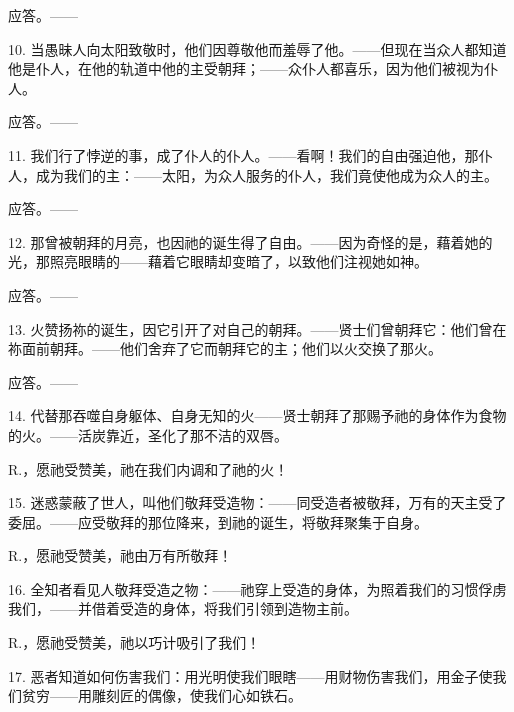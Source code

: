 应答。——\par

10. 当愚昧人向太阳致敬时，他们因尊敬他而羞辱了他。——但现在当众人都知道他是仆人，在他的轨道中他的主受朝拜；——众仆人都喜乐，因为他们被视为仆人。\par

应答。——\par

11. 我们行了悖逆的事，成了仆人的仆人。——看啊！我们的自由强迫他，那仆人，成为我们的主：——太阳，为众人服务的仆人，我们竟使他成为众人的主。\par

应答。——\par

12. 那曾被朝拜的月亮，也因祂的诞生得了自由。——因为奇怪的是，藉着她的光，那照亮眼睛的——藉着它眼睛却变暗了，以致他们注视她如神。\par

应答。——\par

13. 火赞扬祢的诞生，因它引开了对自己的朝拜。——贤士们曾朝拜它：他们曾在祢面前朝拜。——他们舍弃了它而朝拜它的主；他们以火交换了那火。\par

应答。——\par

14. 代替那吞噬自身躯体、自身无知的火——贤士朝拜了那赐予祂的身体作为食物的火。——活炭靠近，圣化了那不洁的双唇。\par

R.，愿祂受赞美，祂在我们内调和了祂的火！\par

15. 迷惑蒙蔽了世人，叫他们敬拜受造物：——同受造者被敬拜，万有的天主受了委屈。——应受敬拜的那位降来，到祂的诞生，将敬拜聚集于自身。\par

R.，愿祂受赞美，祂由万有所敬拜！\par

16. 全知者看见人敬拜受造之物：——祂穿上受造的身体，为照着我们的习惯俘虏我们，——并借着受造的身体，将我们引领到造物主前。\par

R.，愿祂受赞美，祂以巧计吸引了我们！\par

17. 恶者知道如何伤害我们：用光明使我们眼瞎——用财物伤害我们，用金子使我们贫穷——用雕刻匠的偶像，使我们心如铁石。\par

